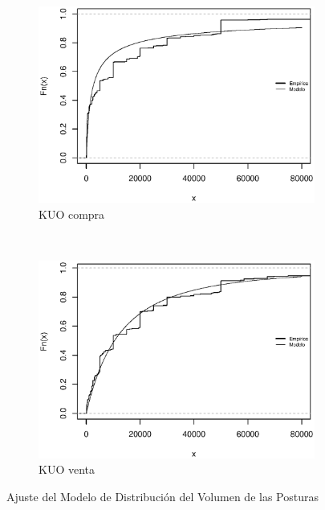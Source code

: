 \documentclass[11pt]{article}
\numberwithin{equation}{section} %
\begin{document}
\begin{figure}[htbp]
\begin{subfigure}[b]{0.5\textwidth}
\centering
\includegraphics[width=\textwidth, trim=0 0.5cm 0 1cm]{kuovolumencompra.eps}
\caption{KUO compra}
\label{fig:kuovolumencompra}
\end{subfigure}%
~ %
\begin{subfigure}[b]{0.5\textwidth}
\centering
\includegraphics[width=\textwidth, trim=0 0.5cm 0 1cm]{kuovolumenventa.eps}
\caption{KUO venta}
\label{fig:kuovolumenventa}
\end{subfigure}

\caption{Ajuste del Modelo de Distribución del Volumen de las Posturas}
\label{fig:volumen}
\end{figure}
\end{document}
